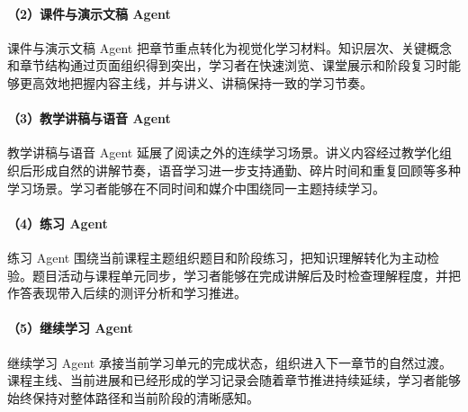 \paragraph{（2）课件与演示文稿 Agent}
课件与演示文稿 Agent 把章节重点转化为视觉化学习材料。知识层次、关键概念和章节结构通过页面组织得到突出，学习者在快速浏览、课堂展示和阶段复习时能够更高效地把握内容主线，并与讲义、讲稿保持一致的学习节奏。

\paragraph{（3）教学讲稿与语音 Agent}
教学讲稿与语音 Agent 延展了阅读之外的连续学习场景。讲义内容经过教学化组织后形成自然的讲解节奏，语音学习进一步支持通勤、碎片时间和重复回顾等多种学习场景。学习者能够在不同时间和媒介中围绕同一主题持续学习。

\paragraph{（4）练习 Agent}
练习 Agent 围绕当前课程主题组织题目和阶段练习，把知识理解转化为主动检验。题目活动与课程单元同步，学习者能够在完成讲解后及时检查理解程度，并把作答表现带入后续的测评分析和学习推进。

\paragraph{（5）继续学习 Agent}
继续学习 Agent 承接当前学习单元的完成状态，组织进入下一章节的自然过渡。课程主线、当前进展和已经形成的学习记录会随着章节推进持续延续，学习者能够始终保持对整体路径和当前阶段的清晰感知。

